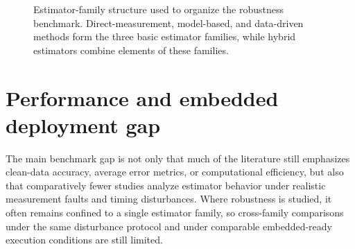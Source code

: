 \documentclass[
    a4paper,
    12pt,
    titlepage,
    bibliography=totoc,
    twoside=on,
    parskip=false,
    numbers=noenddot,
    cleardoublepage=empty,
    DIV=12,
    BCOR=12.0mm,
    headheight=36pt,
    headings=openright
]{scrreprt}
\begin{document}
\begin{figure}[H]
    \centering
    \caption[Estimator-family structure in the robustness benchmark.]{Estimator-family structure used to organize the robustness benchmark. Direct-measurement, model-based, and data-driven methods form the three basic estimator families, while hybrid estimators combine elements of these families.}
    \label{fig:robustness_estimator_families}
\end{figure}

\section{Performance and embedded deployment gap}
The main benchmark gap is not only that much of the literature still emphasizes clean-data accuracy, average error metrics, or computational efficiency, but also that comparatively fewer studies analyze estimator behavior under realistic measurement faults and timing disturbances.\autocite{shrivastavaReviewTechnologicalAdvancement2023,Embedded_AI_only_SOC_mobile,giazitzisCaseStudyTiny2024,mazziStateChargeEstimation2022} Where robustness is studied, it often remains confined to a single estimator family, so cross-family comparisons under the same disturbance protocol and under comparable embedded-ready execution conditions are still limited.\autocite{liRobustnessSOCEstimation2015,naseriReliableWirelessBMS2025}
\end{document}

